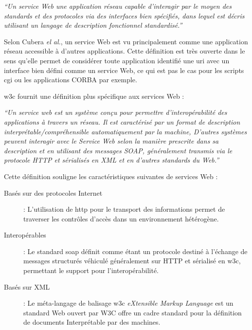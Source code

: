   \textit{``Un service Web une application réseau capable d'interagir
    par le moyen des standards et des protocoles via des interfaces
    bien spécifiés, dans lequel est décris utilisant un langage de
    description fonctionnel standardisé.''}\bigskip

  Selon Cubera \emph{el al.}, un service Web est vu principalement
  comme une application réseau accessible à d'autres
  applications. Cette définition est très ouverte dans le sens qu'elle
  permet de considérer toute application identifié une \acrshort{uri}
  avec un interface bien défini comme un service Web, ce qui est pas
  le cas pour les scripts \acrshort{cgi} ou les applications CORBA par
  exemple.\medskip

  \acrshort{w3c} fournit une définition plus spécifique aux services
  Web \cite{WSA}:\bigskip

  \textit{``Un service web est un système conçu pour permettre
    d'interopérabilité des applications à travers un réseau.  Il est
    caractérisé par un format de description
    interprétable/compréhensible automatiquement par la machine,
    D'autres systèmes peuvent interagir avec le Service Web selon la
    manière prescrite dans sa description et en utilisant des messages
    SOAP, généralement transmis via le protocole HTTP et sérialisés en
    XML et en d'autres standards du Web.''} \bigskip

  Cette définition souligne les caractéristiques suivantes de services
  Web \cite{fremantle2002enterprise}:

  \renewcommand{\descriptionlabel}[1]{\hspace{0.5cm}\textbullet~\textsf{#1}}
  \begin{description}
  \item[Basés sur des protocoles Internet]: L'utilisation de
    \acrshort{http} pour le transport des informations permet de
    traverser les contrôles d'accès dans un environnement hétérogène.

  \item[Interopérables]: Le standard \acrshort{soap}
    \cite{box2000simple} définit comme étant un protocole destiné à
    l'échange de messages structurés véhiculé généralement sur
    \textsc{HTTP} et sérialisé en \acrshort{w3c}, permettant le
    support pour l'interopérabilité.

  \item[Basés sur XML] : Le méta-langage de balisage \acrshort{w3c}
    \textit{eXtensible Markup Language} est un standard Web ouvert par
    \textsc{W3C} \cite{bray1998extensible} offre un cadre standard
    pour la définition de documents Interprétable par des machines.
  \end{description}
  \enddescription

